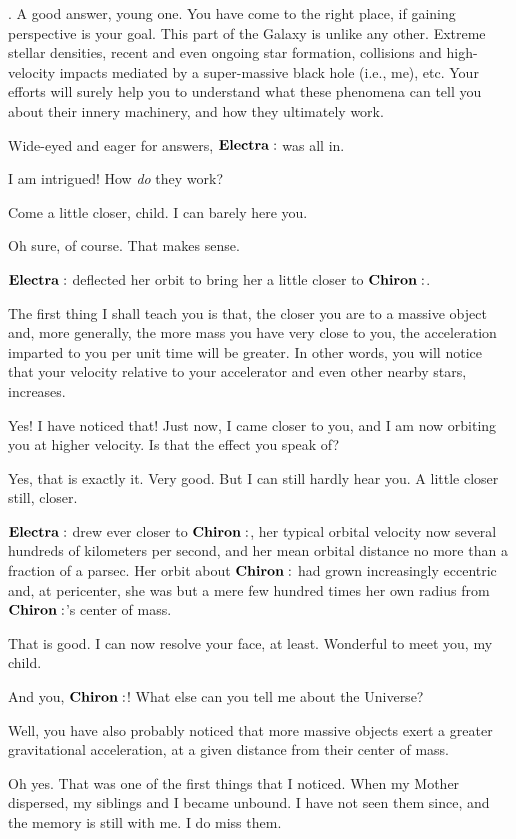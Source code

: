 \Chiron.  A good answer, young one.  You have come to the right place, if gaining perspective is your goal.  This part of the Galaxy is unlike any other.  Extreme stellar densities, recent and even ongoing star formation, collisions and high-velocity impacts mediated by a super-massive black hole (i.e., me), etc.  Your efforts will surely help you to understand what these phenomena can tell you about their innery machinery, and how they ultimately work.

Wide-eyed and eager for answers, $\Electra$ was all in.

\Electra I am intrigued!  How \textit{do} they work?

\Chiron Come a little closer, child.  I can barely here you.

\Electra Oh sure, of course.  That makes sense.

$\Electra$ deflected her orbit to bring her a little closer to $\Chiron$.

\Chiron The first thing I shall teach you is that, the closer you are to a massive object and, more generally, the more mass you have very close to you, the acceleration imparted to you per unit time will be greater.  In other words, you will notice that your velocity relative to your accelerator and even other nearby stars, increases.

\Electra Yes!  I have noticed that!  Just now, I came closer to you, and I am now orbiting you at higher velocity.  Is that the effect you speak of?

\Chiron Yes, that is exactly it.  Very good.  But I can still hardly hear you.  A little closer still, closer.

$\Electra$ drew ever closer to $\Chiron$, her typical orbital velocity now several hundreds of kilometers per second, and her mean orbital distance no more than a fraction of a parsec.  Her orbit about $\Chiron$ had grown increasingly eccentric and, at pericenter, she was but a mere few hundred times her own radius from $\Chiron$'s center of mass.  

\Chiron That is good.  I can now resolve your face, at least.  Wonderful to meet you, my child.

\Electra  And you, $\Chiron$!  What else can you tell me about the Universe?

\Chiron Well, you have also probably noticed that more massive objects exert a greater gravitational acceleration, at a given distance from their center of mass.  

\Electra  Oh yes.  That was one of the first things that I noticed.  When my Mother dispersed, my siblings and I became unbound.  I have not seen them since, and the memory is still with me.  I do miss them.

